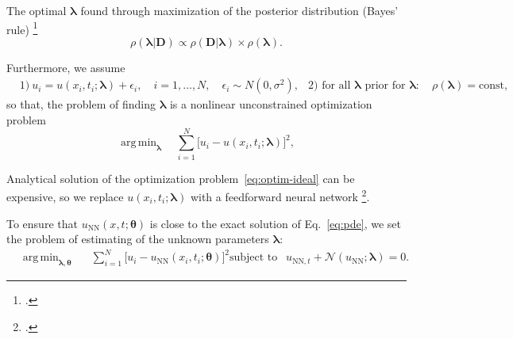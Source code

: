 \documentclass{beamer}
\def\\{}%
\newcommand{\Data}{\vec{D}}
\renewcommand{\vec}[1]{\boldsymbol{#1}}
\newcommand{\VTheta}{\ensuremath{\vec{\theta}}}
\newcommand{\VLambda}{\ensuremath{\vec{\lambda}}}
\DeclareMathOperator*{\argmin}{arg\,min}
\newcommand{\UNN}[1][\text{NN}]{u_{#1}}
\newcommand{\NonlinOp}{\mathcal N\!}
\begin{document}
\begin{frame}

The optimal $\VLambda$ found through
maximization of the posterior distribution (Bayes' rule) \footcite{sivia2006data}
\begin{equation*}
    \rho( \VLambda | \Data ) \propto
    \rho( \Data | \VLambda ) \times \rho( \VLambda ).
\end{equation*}

Furthermore, we assume
\begin{align*}
    & 1)~ u_i = u(x_i, t_i; \VLambda) + \epsilon_i, \quad i=1, \dots, N, \quad \epsilon_i \sim N(0, \sigma^2),\\
    & 2) \text{ for all } \vec{\lambda} \text{ prior for } \VLambda : \quad \rho(\vec{\lambda}) = \text{const},
\end{align*}
so that, the problem of finding $\VLambda$ is a nonlinear unconstrained
optimization problem
\begin{equation*}
    \label{eq:optim-ideal}
    \argmin_{\VLambda} \quad 
    \sum_{i=1}^{N} \big[ u_i - u(x_i, t_i; \VLambda) \big]^2, 
\end{equation*}
    
\end{frame}

\begin{frame}
Analytical solution of the optimization problem~\eqref{eq:optim-ideal} can be expensive, so 
we replace  $u(x_i, t_i; \VLambda)$ with a 
feedforward neural network \footcite{goodfellow2016deep, raissi2017pinnII}.

To ensure that $\UNN( x, t; \VTheta)$
is close to the exact solution of Eq.~\eqref{eq:pde}, we set the problem of estimating of the unknown parameters
$\VLambda$:
\begin{subequations}
\label{eq:optim-final}
\begin{align*}
    &\argmin_{\VLambda, \VTheta} \quad \ \ 
        \sum_{i=1}^N \big[u_i - \UNN(x_i, t_i; \VTheta)\big]^2  \\
    &\text{subject to } \ \ \UNN[\text{NN}, t]  + \NonlinOp(\UNN; \VLambda) = 0.
\end{align*}
\end{subequations}

\end{frame}
\end{document}

